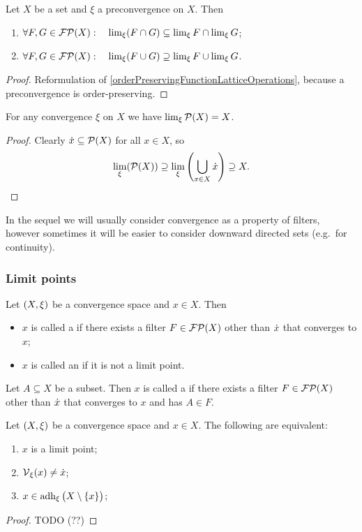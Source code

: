 \begin{lemma}
Let $X$ be a set and $\xi$ a preconvergence on $X$. Then
\begin{enumerate}
\item $\forall F,G \in \operatorname{\mathcal{FP}}(X): \quad \lim_\xi(F\cap G) \subseteq \lim_\xi F \cap \lim_\xi G$;
\item $\forall F,G \in \operatorname{\mathcal{FP}}(X): \quad \lim_\xi(F\cup G) \supseteq \lim_\xi F \cup \lim_\xi G$.
\end{enumerate}
\end{lemma}
\begin{proof}
Reformulation of \ref{orderPreservingFunctionLatticeOperations}, because a preconvergence is order-preserving.
\end{proof}
\begin{corollary} \label{limitDegenerateFilter}
For any convergence $\xi$ on $X$ we have $\lim_\xi \operatorname{\mathcal{P}}(X) = X$.
\end{corollary}
\begin{proof}
Clearly $\dot{x} \subseteq \operatorname{\mathcal{P}}(X)$ for all $x\in X$, so
\[ \lim_\xi(\operatorname{\mathcal{P}}(X)) \supseteq \lim_\xi \left(\bigcup_{x\in X}\dot{x}\right) \supseteq X. \]
\end{proof}

In the sequel we will usually consider convergence as a property of filters, however sometimes it will be easier to consider downward directed sets (e.g.\ for continuity).

\subsubsection{Limit points}
\begin{definition}
Let $\left( X,\xi \right)$ be a convergence space and $x\in X$. Then
\begin{itemize}
\item $x$ is called a  if there exists a filter $F\in\operatorname{\mathcal{FP}}(X)$ other than $\dot{x}$ that converges to $x$;
\item $x$ is called an  if it is not a limit point.
\end{itemize}
Let $A\subseteq X$ be a subset. Then $x$ is called a  if there exists a filter $F\in\operatorname{\mathcal{FP}}(X)$ other than $\dot{x}$ that converges to $x$ and has $A\in F$.
\end{definition}

\begin{proposition}
Let $\left( X,\xi \right)$ be a convergence space and $x\in X$. The following are equivalent:
\begin{enumerate}
\item $x$ is a limit point;
\item $\operatorname{\mathcal{V}}_\xi(x) \neq \dot{x}$;
\item $x\in \operatorname{adh}_\xi\big(X\setminus\{x\}\big)$;
\end{enumerate}
\end{proposition}
\begin{proof}
TODO (??)
\end{proof}

